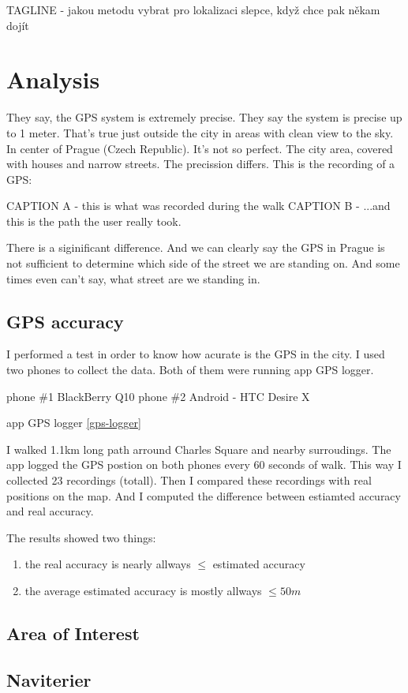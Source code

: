 TAGLINE - jakou metodu vybrat pro lokalizaci slepce, když chce pak někam dojít
	\chapter{Analysis}
	They say, the GPS system is extremely precise. They say the system is precise up to 1 meter. That's true just outside the city in areas with clean view to the sky. In center of Prague (Czech Republic). It's not so perfect. The city area, covered with houses and narrow streets. The precission differs.
	This is the recording of a GPS:
	
	CAPTION A - this is what was recorded during the walk
	CAPTION B - ...and this is the path the user really took.
	
	There is a siginificant difference. And we can clearly say the GPS in Prague is not sufficient to determine which side of the street we are standing on.
	 And some times even can't say, what street are we standing in.
	
	\section{GPS accuracy}
	I performed a test in order to know how acurate is the GPS in the city. I used two phones to collect the data. Both of them were running app GPS logger.
	
	phone \#1  BlackBerry Q10
	phone \#2  Android - HTC Desire X
	
	app		GPS logger \ref{gps-logger}
	
	I walked 1.1km long path arround Charles Square and nearby surroudings. The app logged the GPS postion on both phones every 60 seconds of walk. This way I collected 23 recordings (totall). Then I compared these recordings with real positions on the map. And I computed the difference between estiamted accuracy and real accuracy.
	
	
	The results showed two things:
	\begin{enumerate}
		\item the real accuracy is nearly allways $\leq$ estimated accuracy
		\item the average estimated accuracy is mostly allways $\leq 50m$
	\end{enumerate}
	
	
	
	
	\section{Area of Interest}
	
	\section{Naviterier}